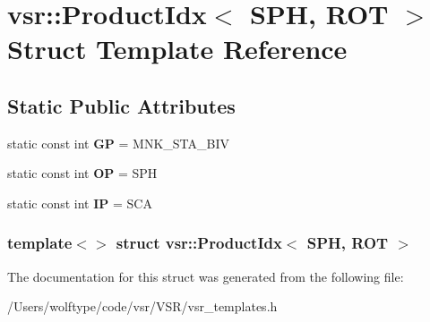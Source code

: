 \hypertarget{structvsr_1_1_product_idx_3_01_s_p_h_00_01_r_o_t_01_4}{\section{vsr\-:\-:Product\-Idx$<$ S\-P\-H, R\-O\-T $>$ Struct Template Reference}
\label{structvsr_1_1_product_idx_3_01_s_p_h_00_01_r_o_t_01_4}
}
\subsection*{Static Public Attributes}
\begin{DoxyCompactItemize}
\item 
\hypertarget{structvsr_1_1_product_idx_3_01_s_p_h_00_01_r_o_t_01_4_a141197d5f97681548de370b069338bfd}{static const int {\bfseries G\-P} = M\-N\-K\-\_\-\-S\-T\-A\-\_\-\-B\-I\-V}\label{structvsr_1_1_product_idx_3_01_s_p_h_00_01_r_o_t_01_4_a141197d5f97681548de370b069338bfd}

\item 
\hypertarget{structvsr_1_1_product_idx_3_01_s_p_h_00_01_r_o_t_01_4_a1063538113f97ddb7264c3e60d4e0ed2}{static const int {\bfseries O\-P} = S\-P\-H}\label{structvsr_1_1_product_idx_3_01_s_p_h_00_01_r_o_t_01_4_a1063538113f97ddb7264c3e60d4e0ed2}

\item 
\hypertarget{structvsr_1_1_product_idx_3_01_s_p_h_00_01_r_o_t_01_4_a33c3c43fbf0e9b8b4619f8f95db6eaa9}{static const int {\bfseries I\-P} = S\-C\-A}\label{structvsr_1_1_product_idx_3_01_s_p_h_00_01_r_o_t_01_4_a33c3c43fbf0e9b8b4619f8f95db6eaa9}

\end{DoxyCompactItemize}
\subsubsection*{template$<$$>$ struct vsr\-::\-Product\-Idx$<$ S\-P\-H, R\-O\-T $>$}



The documentation for this struct was generated from the following file\-:\begin{DoxyCompactItemize}
\item 
/\-Users/wolftype/code/vsr/\-V\-S\-R/vsr\-\_\-templates.\-h\end{DoxyCompactItemize}
